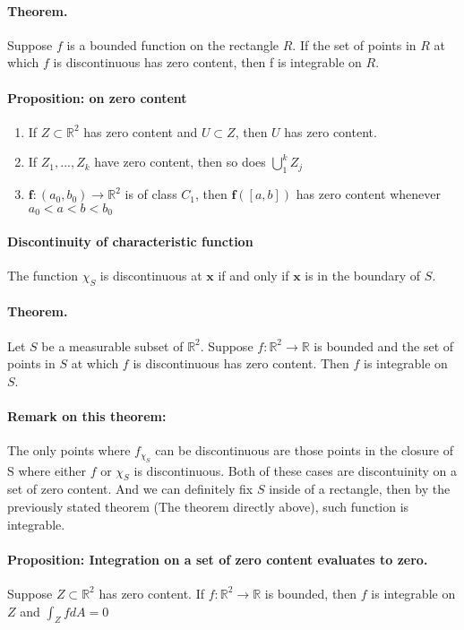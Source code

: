 \documentclass[11pt]{article}
\newcommand{\bx}[0]{\mathbf{x}}
\newcommand{\real}[0]{\mathbb{R}}
\begin{document}
\paragraph{Theorem.} Suppose $f$ is a bounded function on the rectangle $R$. If the set of points in $R$ at which $f$ is discontinuous has zero content, then f is integrable on $R$.

\paragraph{Proposition: on zero content} 
\begin{enumerate}
    \item If $Z\subset \real^2$ has zero content and $U\subset Z$, then $U$ has zero content.
    \item If $Z_1,...,Z_k$ have zero content, then so does $\bigcup_1^k Z_j$
    \item $\mathbf{f}:(a_0, b_0) \xrightarrow{} \real^2$ is of class $C_1$, then $\mathbf{f}([a,b])$ has zero content whenever $a_0<a<b<b_0$
\end{enumerate}

\paragraph{Discontinuity of characteristic function} The function $\chi_S$ is discontinuous at $\bx$ if and only if $\bx$ is in the boundary of $S$.

\paragraph{Theorem.} Let $S$ be a measurable subset of $\real^2$. Suppose $f:{\real^2} \rightarrow{}{\real}$ is bounded and the set of points in $S$ at which $f$ is discontinuous has zero content. Then $f$ is integrable on $S$. 
\paragraph{Remark on this theorem:} The only points where $f_{\chi_S}$ can be discontinuous are those points in the closure of S where either $f$ or $\chi_S$ is discontinuous. Both of these cases are discontuinity on a set of zero content. And we can definitely fix $S$ inside of a rectangle, then by the previously stated theorem (The theorem directly above), such function is integrable.

\paragraph{Proposition: Integration on a set of zero content evaluates to zero.} Suppose $Z\subset \real^2$ has zero content. If $f:\real^2\rightarrow{} \real$ is bounded, then $f$ is integrable on $Z$ and $\int_Z fdA = 0$
\end{document}
